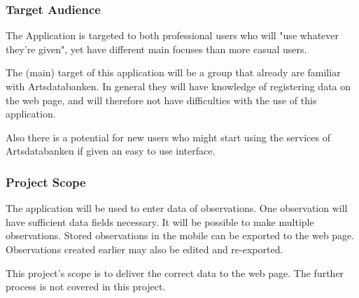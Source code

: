 \subsubsection{Target Audience}
	
The Application is targeted to both professional users who will "use whatever they're given", 
yet have different main focuses than more casual users.

The (main) target of this application will be a group that already are familiar with Artsdatabanken. 
In general they will have knowledge of registering data on the web page, and will therefore not 
have difficulties with the use of this application. 

Also there is a potential for new users who might start using the services of Artsdatabanken if 
given an easy to use interface.


\subsubsection{Project Scope}
The application will be used to enter data of observations. 
One observation will have sufficient data fields necessary. 
It will be possible to make multiple observations. 
Stored observations in the mobile can be exported to the web page. 
Observations created earlier may also be edited and re-exported.

This project's scope is to deliver the correct data to the web page. 
The further process is not covered in this project.
